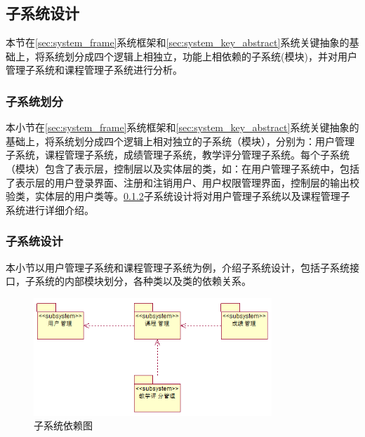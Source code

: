 \subsection{子系统设计}
本节在\ref{sec:system_frame}系统框架和\ref{sec:system_key_abstract}系统关键抽象的基础上，将系统划分成四个逻辑上相独立，功能上相依赖的子系统(模块)，并对用户管理子系统和课程管理子系统进行分析。
\subsubsection{子系统划分}\label{sec:subsystem_div}
本小节在\ref{sec:system_frame}系统框架和\ref{sec:system_key_abstract}系统关键抽象的基础上，将系统划分成四个逻辑上相对独立的子系统（模块），分别为：用户管理子系统，课程管理子系统，成绩管理子系统，教学评分管理子系统。每个子系统（模块）包含了表示层，控制层以及实体层的类，如：在用户管理子系统中，包括了表示层的用户登录界面、注册和注销用户、用户权限管理界面，控制层的输出校验类，实体层的用户类等。\ref{sec:subsystem_design}子系统设计将对用户管理子系统以及课程管理子系统进行详细介绍。
\subsubsection{子系统设计}\label{sec:subsystem_design}
本小节以用户管理子系统和课程管理子系统为例，介绍子系统设计，包括子系统接口，子系统的内部模块划分，各种类以及类的依赖关系。

\begin{figure}[H]
  \centering
  \includegraphics[width=0.8\textwidth]{img/subsystem_depend}
  \caption{子系统依赖图}
\end{figure}

